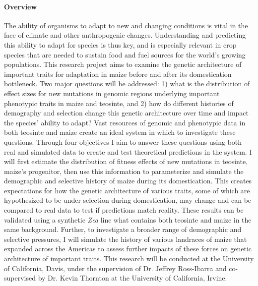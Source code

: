 


\paragraph{Overview} 

The ability of organisms to adapt to new and changing conditions is vital in the face of climate and other anthropogenic changes. Understanding and predicting this ability to adapt for species is thus key, and is especially relevant in crop species that are needed to sustain food and fuel sources for the world's growing populations. This research project aims to examine the genetic architecture of important traits for adaptation in maize before and after its domestication bottleneck. Two major questions will be addressed: 1) what is the distribution of effect sizes for new mutations in genomic regions underlying important phenotypic traits in maize and teosinte, and 2) how do different histories of demography and selection change this genetic architecture over time and impact the species' ability to adapt? Vast resources of genomic and phenotypic data in both teosinte and maize create an ideal system in which to investigate these questions. Through four objectives I aim to answer these questions using both real and simulated data to create and test theoretical predictions in the system. I will first estimate the distribution of fitness effects of new mutations in teosinte, maize's progenitor, then use this information to parameterize and simulate the demographic and selective history of maize during its domestication. This creates expectations for how the genetic architecture of various traits, some of which are hypothesized to be under selection during domestication, may change and can be compared to real data to test if predictions match reality. These results can be validated using a synthetic \emph{Zea} line what contains both teosinte and maize in the same background. Further, to investigate a broader range of demographic and selective pressures, I will simulate the history of various landraces of maize that expanded across the Americas to assess further impacts of these forces on genetic architecture of important traits. This research will be conducted at the University of California, Davis, under the supervision of Dr. Jeffrey Ross\--Ibarra and co-supervised by Dr. Kevin Thornton at the University of California, Irvine.

